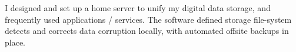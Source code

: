 \descript{ }
I designed and set up a home server to unify my digital data storage, and frequently used applications / services.
The software defined storage file-system detects and corrects data corruption locally, with automated offsite backups in place.
\sectionsep{}